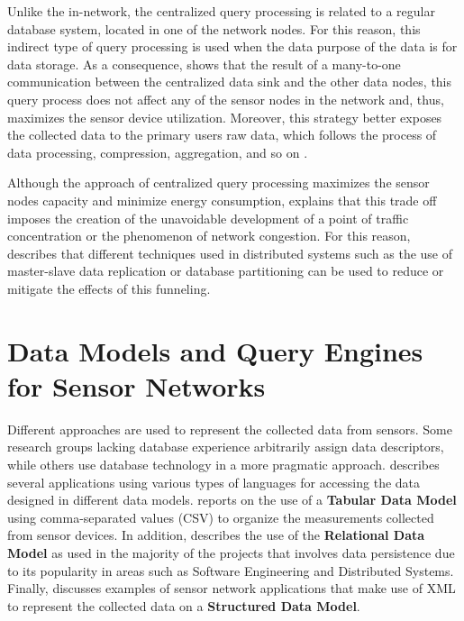 Unlike the in-network, the centralized query processing is related to a regular
database system, located in one of the network nodes. For this reason, this
indirect type of query processing is used when the data purpose of the data is for 
data storage. As a consequence, \cite{sn-storage02} shows that the result of
a many-to-one communication between the centralized data sink
and the other data nodes, this query process does not affect any of the sensor
nodes in the network and, thus, maximizes the sensor device utilization. 
Moreover, this strategy better exposes the collected data to the primary users
raw data, which follows the process of data processing, compression,
aggregation, and so on \cite{sn-db-modeling02}.

Although the approach of centralized query processing maximizes the sensor
nodes capacity and minimize energy consumption, \cite{sn-storage02} explains
that this trade off imposes the creation of the unavoidable development of a
point of traffic concentration or the phenomenon of network congestion. For
this reason, \cite{sn-storage04} describes that different techniques used in 
distributed systems such as the use of master-slave data replication or 
database partitioning \cite{db-partitioning-relational} can be used to reduce
or mitigate the effects of this funneling.

\section{Data Models and Query Engines for Sensor Networks}
\label{sec:data-models}

Different approaches are used to represent the collected data from sensors.
Some research groups lacking database experience arbitrarily assign data 
descriptors, while others use database technology in a more pragmatic approach.
\cite{sn-programming-language} describes several applications using
various types of languages for accessing the data designed in different data
models. \cite{sn-provenance} reports on the use of a \textbf{Tabular Data Model}
\cite{tabular-model} using comma-separated values (CSV) to organize the
measurements collected from sensor devices. In addition, \cite{sn-db-tinydb} 
describes the use of the \textbf{Relational Data Model} \cite{relational-model} 
as used in the majority of the projects that involves data persistence due to its
popularity in areas such as Software Engineering and Distributed Systems. Finally,
\cite{sn-xml-usage01, sn-xml-usage02} discusses examples of sensor network 
applications that make use of XML \cite{xml} to represent the collected data on a 
\textbf{Structured Data Model}.

